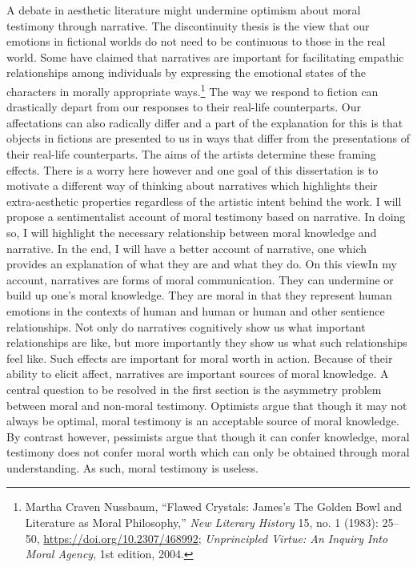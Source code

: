 \documentclass[
  12pt,
]{book}
\theoremstyle{definition}
\theoremstyle{definition}
\theoremstyle{definition}
\theoremstyle{definition}
\theoremstyle{remark}
\begin{document}
A debate in aesthetic literature might undermine optimism about moral testimony through narrative. The discontinuity thesis is the view that our emotions in fictional worlds do not need to be continuous to those in the real world. Some have claimed that narratives are important for facilitating empathic relationships among individuals by expressing the emotional states of the characters in morally appropriate ways.\footnote{Martha Craven Nussbaum, {``Flawed {Crystals}: {James}'s {The Golden Bowl} and {Literature} as {Moral Philosophy},''} \emph{New Literary History} 15, no. 1 (1983): 25--50, \url{https://doi.org/10.2307/468992}; \emph{Unprincipled {Virtue}: {An Inquiry Into Moral Agency}}, 1st edition, 2004.} The way we respond to fiction can drastically depart from our responses to their real-life counterparts. Our affectations can also radically differ and a part of the explanation for this is that objects in fictions are presented to us in ways that differ from the presentations of their real-life counterparts. The aims of the artists determine these framing effects. There is a worry here however and one goal of this dissertation is to motivate a different way of thinking about narratives which highlights their extra-aesthetic properties regardless of the artistic intent behind the work. I will propose a sentimentalist account of moral testimony based on narrative. In doing so, I will highlight the necessary relationship between moral knowledge and narrative. In the end, I will have a better account of narrative, one which provides an explanation of what they are and what they do. On this viewIn my account, narratives are forms of moral communication. They can undermine or build up one's moral knowledge. They are moral in that they represent human emotions in the contexts of human and human or human and other sentience relationships. Not only do narratives cognitively show us what important relationships are like, but more importantly they show us what such relationships feel like. Such effects are important for moral worth in action. Because of their ability to elicit affect, narratives are important sources of moral knowledge. A central question to be resolved in the first section is the asymmetry problem between moral and non-moral testimony. Optimists argue that though it may not always be optimal, moral testimony is an acceptable source of moral knowledge. By contrast however, pessimists argue that though it can confer knowledge, moral testimony does not confer moral worth which can only be obtained through moral understanding. As such, moral testimony is useless.
\end{document}
